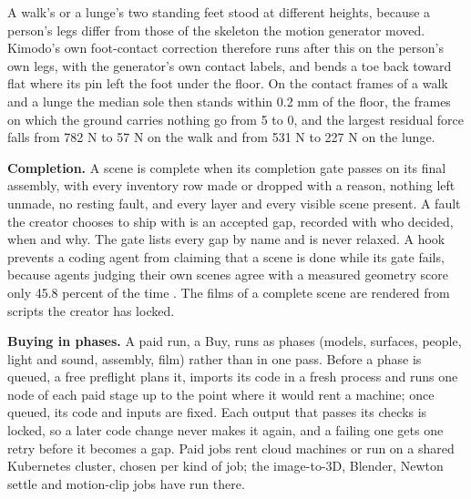 A walk's or a lunge's two standing feet stood at different heights, because a person's legs differ from those of the skeleton the motion generator moved. Kimodo's own foot-contact correction therefore runs after this on the person's own legs, with the generator's own contact labels, and bends a toe back toward flat where its pin left the foot under the floor. On the contact frames of a walk and a lunge the median sole then stands within 0.2 mm of the floor, the frames on which the ground carries nothing go from 5 to 0, and the largest residual force falls from 782 N to 57 N on the walk and from 531 N to 227 N on the lunge.

\begin{center}\end{center}

\textbf{Completion.} A scene is complete when its completion gate passes on its final assembly, with every inventory row made or dropped with a reason, nothing left unmade, no resting fault, and every layer and every visible scene present. A fault the creator chooses to ship with is an accepted gap, recorded with who decided, when and why. The gate lists every gap by name and is never relaxed. A hook prevents a coding agent from claiming that a scene is done while its gate fails, because agents judging their own scenes agree with a measured geometry score only 45.8 percent of the time \citep{li2026lego}. The films of a complete scene are rendered from scripts the creator has locked.

\textbf{Buying in phases.} A paid run, a Buy, runs as phases (models, surfaces, people, light and sound, assembly, film) rather than in one pass. Before a phase is queued, a free preflight plans it, imports its code in a fresh process and runs one node of each paid stage up to the point where it would rent a machine; once queued, its code and inputs are fixed. Each output that passes its checks is locked, so a later code change never makes it again, and a failing one gets one retry before it becomes a gap. Paid jobs rent cloud machines or run on a shared Kubernetes cluster, chosen per kind of job; the image-to-3D, Blender, Newton settle and motion-clip jobs have run there.
